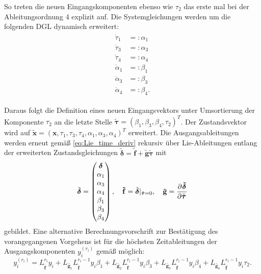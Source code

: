 So treten die neuen Eingangskomponenten ebenso wie $\tau_2$ das erste mal bei der Ableitungsordnung 4 explizit auf. Die Systemgleichungen werden um die folgenden DGL dynamisch erweitert:
\begin{align}
	\begin{split}
		\dot{\tau}_1 &=: \alpha_1 \\
		\dot{\tau}_3 &=: \alpha_3 \\
		\dot{\tau}_4 &=: \alpha_4 \\
		\dot{\alpha}_1 &=: \beta_1 \\
		\dot{\alpha}_3 &=: \beta_3 \\
		\dot{\alpha}_4 &=: \beta_4 .
	\end{split}
\end{align}

Daraus folgt die Definition eines neuen Eingangsvektors unter Umsortierung der Komponente $\tau_2$ an die letzte Stelle $\tilde{\boldsymbol{\tau}} = (\beta_1,  \beta_3,  \beta_4, \tau_2)^T$. Der Zustandsvektor wird auf $\tilde{\mathbf{x}} = (\mathbf{x}, \tau_1, \tau_3, \tau_4, \alpha_1, \alpha_3, \alpha_4)^T$ erweitert. Die Ausgangsableitungen werden erneut gemäß \eqref{eq:Lie_time_deriv} rekursiv über Lie-Ableitungen entlang der erweiterten Zustandsgleichungen  $\tilde{\boldsymbol{\delta}} = \mathbf{\tilde{f}} + \mathbf{\tilde{g}} \tilde{\boldsymbol{\tau}}$ mit
\begin{align}
	\tilde{\boldsymbol{\delta}} =
	\left(\begin{matrix}
		\boldsymbol{\delta} \\
		\alpha_1 \\
		\alpha_3 \\
		\alpha_4 \\
		\beta_1 \\
		\beta_3 \\
		\beta_4 \\	
	\end{matrix}\right), \quad
	\mathbf{\tilde{f}} = \tilde{\boldsymbol{\delta}}|_{\tilde{\boldsymbol{\tau}} = 0}, \quad
	\mathbf{\tilde{g}} = \frac{\partial^{}\boldsymbol{\tilde{\delta}}}{\partial{\tilde{\boldsymbol{\tau}}}^{}}
\end{align}
gebildet. Eine alternative Berechnungsvorschrift zur Bestätigung des vorangegangenen Vorgehens ist für die höchsten Zeitableitungen der Ausgangskomponenten $y_i^{(r_i)}$ gemäß \cite[S. 195]{NLRT_Roebenack} möglich:
\begin{equation}
	y_i^{(r_i)} = L_{\tilde{\mathbf{f}}}^{r_i} y_i + L_{\tilde{\mathbf{g}_1}} L_{\tilde{\mathbf{f}}}^{r_i-1} y_i \beta_1 + L_{\tilde{\mathbf{g}_2}} L_{\tilde{\mathbf{f}}}^{r_i-1} y_i \beta_3 + L_{\tilde{\mathbf{g}_3}} L_{\tilde{\mathbf{f}}}^{r_i-1} y_i \beta_4 + L_{\tilde{\mathbf{g}_4}} L_{\tilde{\mathbf{f}}}^{r_i-1} y_i \tau_2 .
\end{equation}

